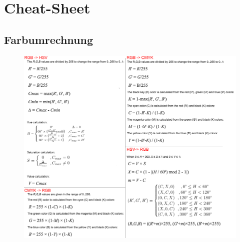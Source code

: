 \clearpage
\section{Cheat-Sheet}
\subsection{Farbumrechnung}
\begin{figure}[!ht]
	\includegraphics[width=1.0\linewidth]{fig/cheatsheet}
\end{figure}
\noindent

